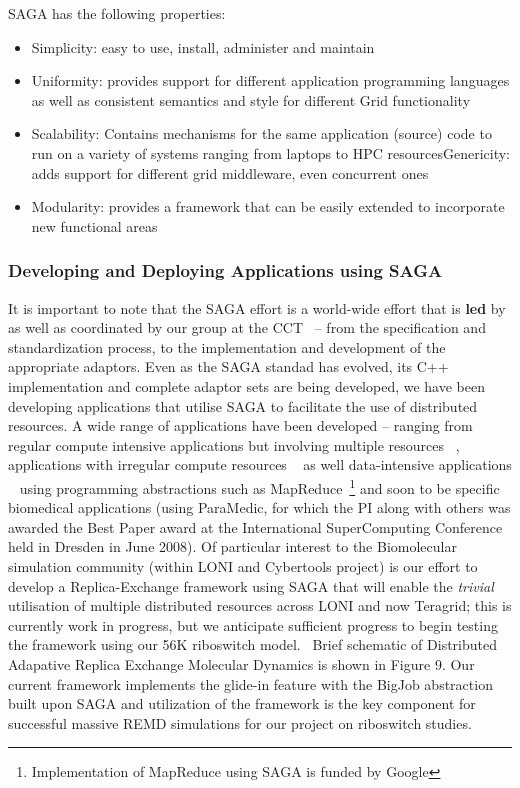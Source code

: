 \documentclass[a4paper,10pt]{article}
\begin{document}
SAGA has the following properties:

\begin{itemize}
\item Simplicity: easy to use, install, administer and maintain
\item Uniformity: provides support for different application programming languages as well as consistent 
semantics and style for different Grid functionality
\item Scalability: Contains mechanisms for the same application (source) code to run on a variety of 
systems ranging from laptops to HPC resourcesGenericity: adds support for different grid middleware, 
even concurrent ones
\item Modularity: provides a framework that can be easily extended to incorporate new functional areas
\end{itemize}


\subsubsection*{Developing and Deploying Applications using SAGA}

It is important to note that the SAGA effort is a world-wide effort that is {\bf led} by as well as coordinated by our group at the CCT~\cite{saga_url} -- from the specification and standardization process, to the implementation and development of the appropriate adaptors.  Even as the SAGA standad has evolved, its C++ implementation and complete adaptor sets are being developed, we have been developing applications that utilise SAGA to facilitate the use of distributed resources.  A wide range of applications have been developed -- ranging from regular compute intensive applications but involving multiple resources ~\cite{saga_escience07}, applications with irregular compute resources ~\cite{teragrid08} as well data-intensive applications ~\cite{sagamapreduce} using programming abstractions such as MapReduce~\footnote{Implementation of MapReduce using SAGA is funded by Google} and soon to be specific biomedical applications (using ParaMedic, for which the PI along with others was awarded the Best Paper award at the International SuperComputing Conference held in Dresden in June 2008). Of particular interest to the Biomolecular simulation community (within LONI and Cybertools project) is our effort to develop a Replica-Exchange framework using SAGA that will enable the {\it trivial} utilisation of multiple distributed resources across LONI and now Teragrid; this is currently work in progress, but we anticipate sufficient progress to begin testing the framework using our 56K riboswitch model.~\cite{REMD-PhilTranA2009} Brief schematic of Distributed Adapative Replica Exchange Molecular Dynamics is shown in Figure 9.  Our current framework implements the glide-in feature with the BigJob abstraction built upon SAGA and utilization of the framework is the key component for successful massive REMD simulations for our project on riboswitch studies.
\end{document}
